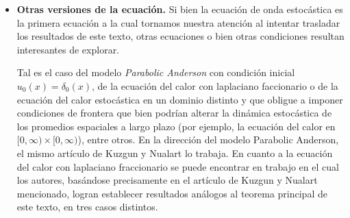 \documentclass[letterpaper,twoside,12pt]{book}
\newcommand{\1}{\mathds{1}}
\theoremstyle{definition}
\theoremstyle{definition}
\theoremstyle{remark}
\theoremstyle{definition}
\theoremstyle{definition}
\theoremstyle{definition}
\theoremstyle{definition}
\theoremstyle{definition}
\begin{document}
\begin{itemize}
   \item \textbf{Otras versiones de la ecuación.} Si bien la ecuación de onda estocástica es la primera ecuación a la cual tornamos nuestra atención al intentar trasladar los resultados de este texto, otras ecuaciones o bien otras condiciones resultan interesantes de explorar.
    
   Tal es el caso del modelo \textit{Parabolic Anderson} con condición inicial $u_0(x)=\delta_0(x)$, de la ecuación del calor con laplaciano faccionario o de la ecuación del calor estocástica en un dominio distinto y que obligue a imponer condiciones de frontera que bien podrían alterar la dinámica estocástica de los promedios espaciales a largo plazo (por ejemplo, la ecuación del calor en $[0,\infty)\times [0,\infty)$), entre otros. En la dirección del modelo Parabolic Anderson, el mismo artículo de Kuzgun y Nualart \cite{KUZGUN202268} lo trabaja. En cuanto a la ecuación del calor con laplaciano fraccionario se puede encontrar en \cite{zhang2023convergence} trabajo en el cual los autores, basándose precisamente en el artículo de Kuzgun y Nualart mencionado, logran establecer resultados análogos al teorema principal de este texto, en tres casos distintos. 


\end{itemize}
\end{document}
